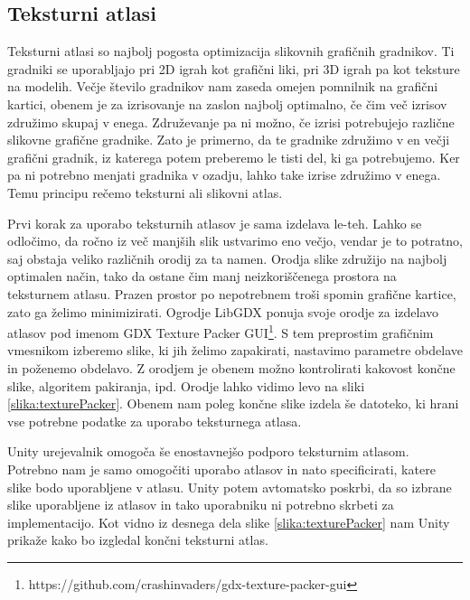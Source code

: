 \documentclass[12pt,a4paper,twoside]{book}
\begin{document}
\subsection{Teksturni atlasi}
Teksturni atlasi so najbolj pogosta optimizacija slikovnih grafičnih gradnikov. Ti gradniki se uporabljajo pri 2D igrah kot grafični liki, pri 3D igrah pa kot teksture na modelih. Večje število gradnikov nam zaseda omejen pomnilnik na grafični kartici, obenem je za izrisovanje na zaslon najbolj optimalno, če čim več izrisov združimo skupaj v enega. Združevanje pa ni možno, če izrisi potrebujejo različne slikovne grafične gradnike. Zato je primerno, da te gradnike združimo v en večji grafični gradnik, iz katerega potem preberemo le tisti del, ki ga potrebujemo. Ker pa ni potrebno menjati gradnika v ozadju, lahko take izrise združimo v enega. Temu principu rečemo teksturni ali slikovni atlas.

Prvi korak za uporabo teksturnih atlasov je sama izdelava le-teh. Lahko se odločimo, da ročno iz več manjših slik ustvarimo eno večjo, vendar je to potratno, saj obstaja veliko različnih orodij za ta namen. Orodja slike združijo na najbolj optimalen način, tako da ostane čim manj neizkoriščenega prostora na teksturnem atlasu. Prazen prostor po nepotrebnem troši spomin grafične kartice, zato ga želimo minimizirati. Ogrodje LibGDX ponuja svoje orodje za izdelavo atlasov pod imenom GDX Texture Packer GUI\footnote{https://github.com/crashinvaders/gdx-texture-packer-gui}. S tem preprostim grafičnim vmesnikom izberemo slike, ki jih želimo zapakirati, nastavimo parametre obdelave in poženemo obdelavo. Z orodjem je obenem možno kontrolirati kakovost končne slike, algoritem pakiranja, ipd. Orodje lahko vidimo levo na sliki \ref{slika:texturePacker}. Obenem nam poleg končne slike izdela še datoteko, ki hrani vse potrebne podatke za uporabo teksturnega atlasa.

Unity urejevalnik omogoča še enostavnejšo podporo teksturnim atlasom. Potrebno nam je samo omogočiti uporabo atlasov in nato specificirati, katere slike bodo uporabljene v atlasu. Unity potem avtomatsko poskrbi, da so izbrane slike uporabljene iz atlasov in tako uporabniku ni potrebno skrbeti za implementacijo. Kot vidno iz desnega dela slike \ref{slika:texturePacker} nam Unity prikaže kako bo izgledal končni teksturni atlas.
\end{document}
